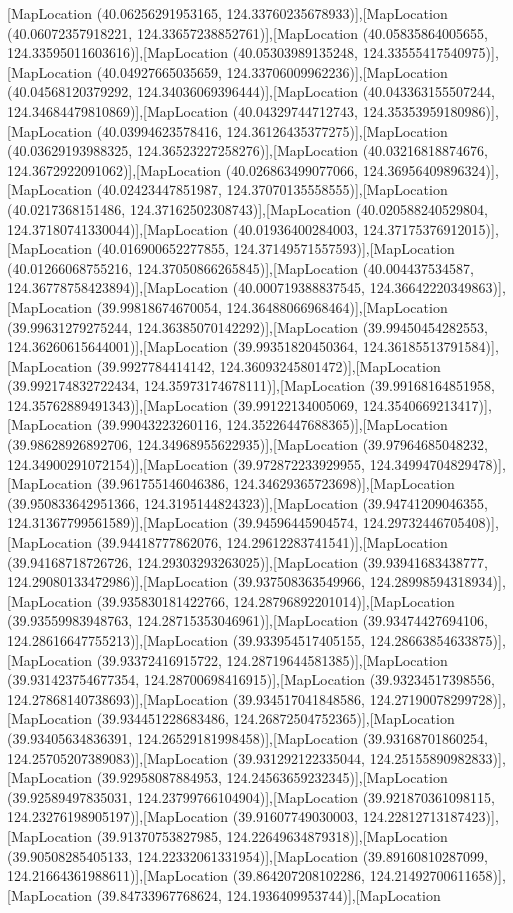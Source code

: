 [MapLocation (40.06256291953165, 124.33760235678933)],[MapLocation (40.06072357918221, 124.33657238852761)],[MapLocation (40.05835864005655, 124.33595011603616)],[MapLocation (40.05303989135248, 124.33555417540975)],[MapLocation (40.04927665035659, 124.33706009962236)],[MapLocation (40.04568120379292, 124.34036069396444)],[MapLocation (40.043363155507244, 124.34684479810869)],[MapLocation (40.04329744712743, 124.35353959180986)],[MapLocation (40.03994623578416, 124.36126435377275)],[MapLocation (40.03629193988325, 124.36523227258276)],[MapLocation (40.03216818874676, 124.3672922091062)],[MapLocation (40.026863499077066, 124.36956409896324)],[MapLocation (40.02423447851987, 124.37070135558555)],[MapLocation (40.0217368151486, 124.37162502308743)],[MapLocation (40.020588240529804, 124.37180741330044)],[MapLocation (40.01936400284003, 124.37175376912015)],[MapLocation (40.016900652277855, 124.37149571557593)],[MapLocation (40.01266068755216, 124.37050866265845)],[MapLocation (40.004437534587, 124.36778758423894)],[MapLocation (40.000719388837545, 124.36642220349863)],[MapLocation (39.99818674670054, 124.36488066968464)],[MapLocation (39.99631279275244, 124.36385070142292)],[MapLocation (39.99450454282553, 124.36260615644001)],[MapLocation (39.99351820450364, 124.36185513791584)],[MapLocation (39.9927784414142, 124.36093245801472)],[MapLocation (39.992174832722434, 124.35973174678111)],[MapLocation (39.99168164851958, 124.35762889491343)],[MapLocation (39.99122134005069, 124.3540669213417)],[MapLocation (39.99043223260116, 124.35226447688365)],[MapLocation (39.98628926892706, 124.34968955622935)],[MapLocation (39.97964685048232, 124.34900291072154)],[MapLocation (39.972872233929955, 124.34994704829478)],[MapLocation (39.961755146046386, 124.34629365723698)],[MapLocation (39.950833642951366, 124.3195144824323)],[MapLocation (39.94741209046355, 124.31367799561589)],[MapLocation (39.94596445904574, 124.29732446705408)],[MapLocation (39.94418777862076, 124.29612283741541)],[MapLocation (39.94168718726726, 124.29303293263025)],[MapLocation (39.93941683438777, 124.29080133472986)],[MapLocation (39.937508363549966, 124.28998594318934)],[MapLocation (39.935830181422766, 124.28796892201014)],[MapLocation (39.93559983948763, 124.28715353046961)],[MapLocation (39.93474427694106, 124.28616647755213)],[MapLocation (39.933954517405155, 124.28663854633875)],[MapLocation (39.93372416915722, 124.28719644581385)],[MapLocation (39.931423754677354, 124.28700698416915)],[MapLocation (39.93234517398556, 124.27868140738693)],[MapLocation (39.934517041848586, 124.27190078299728)],[MapLocation (39.934451228683486, 124.26872504752365)],[MapLocation (39.93405634836391, 124.26529181998458)],[MapLocation (39.93168701860254, 124.25705207389083)],[MapLocation (39.931292122335044, 124.25155890982833)],[MapLocation (39.92958087884953, 124.24563659232345)],[MapLocation (39.92589497835031, 124.23799766104904)],[MapLocation (39.921870361098115, 124.23276198905197)],[MapLocation (39.91607749030003, 124.22812713187423)],[MapLocation (39.91370753827985, 124.22649634879318)],[MapLocation (39.90508285405133, 124.22332061331954)],[MapLocation (39.89160810287099, 124.21664361988611)],[MapLocation (39.864207208102286, 124.21492700611658)],[MapLocation (39.84733967768624, 124.1936409953744)],[MapLocation 